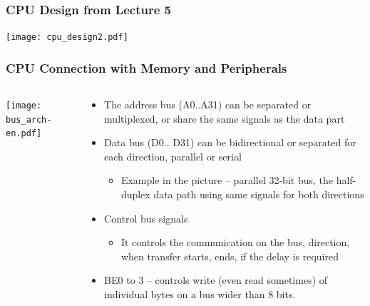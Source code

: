\documentclass{beamer}
\begin{document}
\begin{frame}
\frametitle{CPU Design from Lecture 5}
\texttt{[image: cpu\_design2.pdf]}
\end{frame}


\begin{frame}
\frametitle{CPU Connection with Memory and Peripherals}
\begin{columns}
\begin{column}{0.4\textwidth}
\texttt{[image: bus\_arch-en.pdf]}
\end{column}
\begin{column}{0.6\textwidth}
\begin{itemize}
\item The address bus (A0..A31) can be separated or multiplexed, or share the same signals as the data part
\item Data bus (D0.. D31) can be bidirectional or separated for each direction, parallel or serial
\begin{itemize}
\item Example in the picture -- parallel 32-bit bus, the half-duplex data path using same signals for both directions
\end{itemize}
\item Control bus signals
\begin{itemize}
\item It controls the communication on the bus, direction, when transfer starts, ends, if the delay is required
\end{itemize}
\item BE0 to 3 -- controls write (even read sometimes) of individual bytes on a bus wider than 8 bits.
\end{itemize}
\end{column}
\end{columns}
\end{frame}
\end{document}
